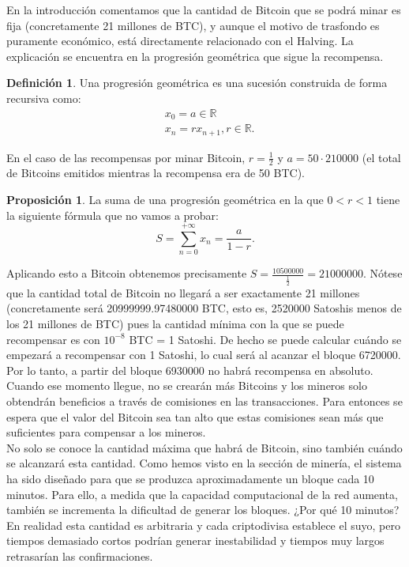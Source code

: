 \documentclass[twoside]{article}
\theoremstyle{definition}
\newtheorem{defi}[teorema]{Definición}
\newtheorem{prop}[teorema]{Proposición}
\newcommand{\R}{\mathbb{R}}
\begin{document}
En la introducción comentamos que la cantidad de Bitcoin que se podrá minar es fija (concretamente 21 millones de BTC), y aunque el motivo de trasfondo es puramente económico, está directamente relacionado con el Halving. La explicación se encuentra en la progresión geométrica que sigue la recompensa. 

\begin{defi}
Una progresión geométrica es una sucesión construida de forma recursiva como:
\begin{align*}
&x_0=a\in\R\\
&x_n=rx_{n+1}, r\in\R .
\end{align*}
\end{defi}

En el caso de las recompensas por minar Bitcoin, $r=\frac{1}{2}$ y $a=50\cdot 210000$ (el total de Bitcoins emitidos mientras la recompensa era de 50 BTC). \begin{prop}
La suma de una progresión geométrica en la que $0<r<1$ tiene la siguiente fórmula que no vamos a probar:
\[
S=\sum_{n=0}^{+\infty}x_n=\frac{a}{1-r}.
\]
\end{prop}

Aplicando esto a Bitcoin obtenemos precisamente $S=\frac{10500000}{\frac{1}{2}} = 21000000$. Nótese que la cantidad total de Bitcoin no llegará a ser exactamente 21 millones (concretamente será 20999999.97480000 BTC, esto es, 2520000 Satoshis menos de los 21 millones de BTC) pues la cantidad mínima con la que se puede recompensar es con $10^{-8}$ BTC = 1 Satoshi. De hecho se puede calcular cuándo se empezará a recompensar con 1 Satoshi, lo cual será al acanzar el bloque 6720000. Por lo tanto, a partir del bloque 6930000 no habrá recompensa en absoluto. Cuando ese momento llegue, no se crearán más Bitcoins y los mineros solo obtendrán beneficios a través de comisiones en las transacciones. Para entonces se espera que el valor del Bitcoin sea tan alto que estas comisiones sean más que suficientes para compensar a los mineros.\\

No solo se conoce la cantidad máxima que habrá de Bitcoin, sino también cuándo se alcanzará esta cantidad. Como hemos visto en la sección de minería, el sistema ha sido diseñado para que se produzca aproximadamente un bloque cada 10 minutos. Para ello, a medida que la capacidad computacional de la red aumenta, también se incrementa la dificultad de generar los bloques. ¿Por qué 10 minutos? En realidad esta cantidad es arbitraria y cada criptodivisa establece el suyo, pero tiempos demasiado cortos podrían generar inestabilidad y tiempos muy largos retrasarían las confirmaciones. 
\end{document}
